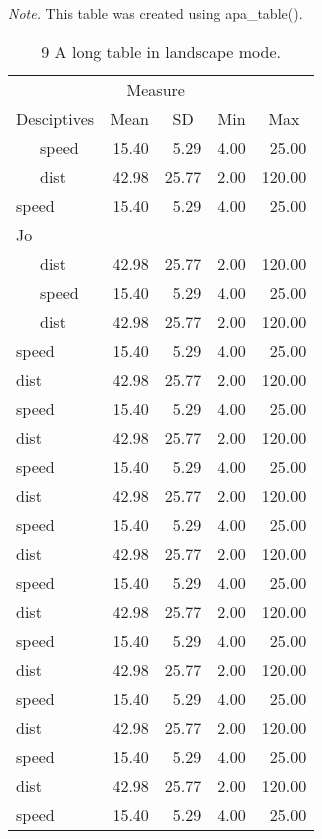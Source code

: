 \documentclass[english,man]{apa6}
\makeatletter
\newenvironment{lltable}
  {\begin{landscape}\begin{center}\begin{ThreePartTable}}
  {\end{ThreePartTable}\end{center}\end{landscape}}
\newcommand\LastLTentrywidth{1em}
\newlength\longtablewidth
\newcommand\getlongtablewidth{%
 \begingroup
  \ifcsname LT@\roman{LT@tables}\endcsname
  \global\longtablewidth=0pt
  \renewcommand\LT@entry[2]{\global\advance\longtablewidth by ##2\relax\gdef\LastLTentrywidth{##2}}%
  \@nameuse{LT@\roman{LT@tables}}%
  \fi
\endgroup}
\makeatother
\begin{document}
\begin{lltable}
\begin{TableNotes}[para]
\textit{Note.} This table was created using apa\_table().
\end{TableNotes}
\begin{longtable}{lrrlr}\noalign{\getlongtablewidth\global\LTcapwidth=\longtablewidth}
\caption{\label{tab:unnamed-chunk-8}9 A long table in landscape mode.}\\
\toprule
 & \multicolumn{2}{c}{Measure}  &  &\\
\cmidrule(r){2-3}
Desciptives & \multicolumn{1}{c}{Mean} & \multicolumn{1}{c}{SD} & \multicolumn{1}{c}{Min} & \multicolumn{1}{c}{Max}\\
\midrule
\ \ \ speed & 15.40 & 5.29 & 4.00 & 25.00\\
\ \ \ dist & 42.98 & 25.77 & 2.00 & 120.00\\
speed & 15.40 & 5.29 & 4.00 & 25.00\\
Jo &  &  &  & \\ \midrule
\ \ \ dist & 42.98 & 25.77 & 2.00 & 120.00\\
\ \ \ speed & 15.40 & 5.29 & 4.00 & 25.00\\
\ \ \ dist & 42.98 & 25.77 & 2.00 & 120.00\\
speed & 15.40 & 5.29 & 4.00 & 25.00\\
dist & 42.98 & 25.77 & 2.00 & 120.00\\
speed & 15.40 & 5.29 & 4.00 & 25.00\\
dist & 42.98 & 25.77 & 2.00 & 120.00\\
speed & 15.40 & 5.29 & 4.00 & 25.00\\
dist & 42.98 & 25.77 & 2.00 & 120.00\\
speed & 15.40 & 5.29 & 4.00 & 25.00\\
dist & 42.98 & 25.77 & 2.00 & 120.00\\
speed & 15.40 & 5.29 & 4.00 & 25.00\\
dist & 42.98 & 25.77 & 2.00 & 120.00\\
speed & 15.40 & 5.29 & 4.00 & 25.00\\
dist & 42.98 & 25.77 & 2.00 & 120.00\\
speed & 15.40 & 5.29 & 4.00 & 25.00\\
dist & 42.98 & 25.77 & 2.00 & 120.00\\
speed & 15.40 & 5.29 & 4.00 & 25.00\\
dist & 42.98 & 25.77 & 2.00 & 120.00\\
speed & 15.40 & 5.29 & 4.00 & 25.00\\

\end{longtable}
\end{lltable}
\end{document}
